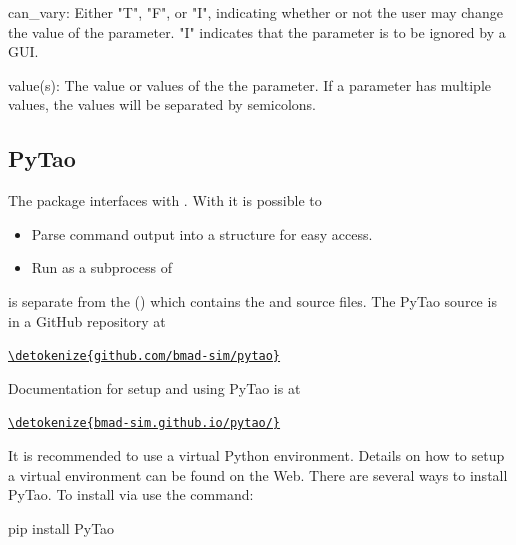 \documentclass{hitec}     %
\newenvironment{display}
  {\vspace*{-1.5ex} \begin{alltt}}
  {\end{alltt} \vspace*{-1.0ex}}
\begin{document}
{\begin{code}
can_vary: Either "T", "F", or "I", indicating whether or not the
          user may change the value of the parameter. "I" indicates
          that the parameter is to be ignored by a GUI.

value(s): The value or values of the the parameter. If a parameter has 
          multiple values, the values will be separated by semicolons.
\end{code}



\subsection{PyTao}
\label{s:pytao}

The   package interfaces \tao with .  With  it is possible
to
\begin{itemize}
\item
Parse  command output into a  structure for easy access.
\item
Run \tao as a subprocess of 
\end{itemize}

 is separate from the \bmad {} () which contains the \bmad and
\tao source files. The PyTao source is in a GitHub repository at
\begin{display}
  \url{\detokenize{github.com/bmad-sim/pytao}}
\end{display}
Documentation for setup and using PyTao is at
\begin{display}
  \url{\detokenize{bmad-sim.github.io/pytao/}}
\end{display}

It is recommended to use a virtual Python environment. Details on how to setup a virtual environment can
be found on the Web. There are several ways to install PyTao. To install via  use the command:
\begin{code}
  pip install PyTao
\end{code}
\end{document}
